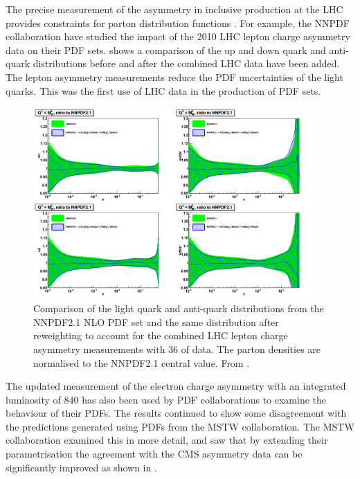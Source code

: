 The precise measurement of the asymmetry in inclusive \PW production at the LHC
provides constraints for parton distribution functions \cite{asym840}.  For
example, the NNPDF collaboration \cite{Lionetti:2011pw} have studied the impact
of the 2010 LHC \PW lepton charge asymmetry data on their PDF sets\cite{Ball:2011gg}.
 shows a comparison of the up and down quark and
anti-quark distributions before and after the combined LHC data have been
added\cite{Ball:2011gg}.  The lepton asymmetry measurements reduce the PDF
uncertainties of the light quarks. This was the first use of LHC data in
the production of PDF sets. 

\begin{figure}[htbp]
  \begin{center}
  \includegraphics*[width=0.95\textwidth]{nnpdf_better}
  \caption[Comparison of the light quark and anti-quark distributions from the
NNPDF2.1 NLO PDF set and the same distribution after reweighting to account for
the LHC lepton charge asymmetry measurements with \unit{36}{\invpb} of data.]
{Comparison of the light quark and anti-quark distributions from the NNPDF2.1
NLO PDF set and the same distribution after reweighting to account for the
combined LHC lepton charge asymmetry measurements with \unit{36}{\invpb} of
data.  The parton densities are normalised to the NNPDF2.1 central value.  From
\cite{Ball:2011gg}. } \label{fig:effect}
  \end{center}
\end{figure}

The updated measurement of the electron charge asymmetry with an integrated
luminosity of \unit{840}{\invpb} has also been used by PDF collaborations to
examine the behaviour of their PDFs.  The results continued to show some
disagreement with the predictions generated using PDFs from the MSTW
collaboration.  The MSTW collaboration examined this in more
detail\cite{martin2013extended}, and saw that by extending their
parametrisation the agreement with the CMS asymmetry data can be significantly
improved as shown in .


